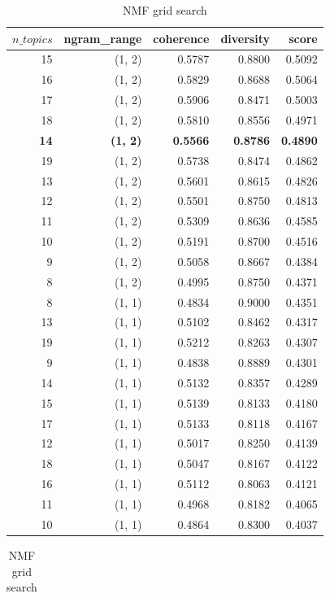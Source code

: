 \documentclass{article}
\begin{document}
\begin{table}[htbp]
\centering
\small
\begin{minipage}{0.42\textwidth}
\begin{tabular}{rrrrr}
\hline
$n\_topics$ & ngram\_range & coherence & diversity & score \\
\hline
15 & (1, 2) & 0.5787 & 0.8800 & 0.5092 \\
16 & (1, 2) & 0.5829 & 0.8688 & 0.5064 \\
17 & (1, 2) & 0.5906 & 0.8471 & 0.5003 \\
18 & (1, 2) & 0.5810 & 0.8556 & 0.4971 \\
\textbf{14} & \textbf{(1, 2)} & \textbf{0.5566} & \textbf{0.8786} & \textbf{0.4890} \\
19 & (1, 2) & 0.5738 & 0.8474 & 0.4862 \\
13 & (1, 2) & 0.5601 & 0.8615 & 0.4826 \\
12 & (1, 2) & 0.5501 & 0.8750 & 0.4813 \\
11 & (1, 2) & 0.5309 & 0.8636 & 0.4585 \\
10 & (1, 2) & 0.5191 & 0.8700 & 0.4516 \\
9  & (1, 2) & 0.5058 & 0.8667 & 0.4384 \\
8  & (1, 2) & 0.4995 & 0.8750 & 0.4371 \\
8  & (1, 1) & 0.4834 & 0.9000 & 0.4351 \\
13 & (1, 1) & 0.5102 & 0.8462 & 0.4317 \\
19 & (1, 1) & 0.5212 & 0.8263 & 0.4307 \\
9  & (1, 1) & 0.4838 & 0.8889 & 0.4301 \\
14 & (1, 1) & 0.5132 & 0.8357 & 0.4289 \\
15 & (1, 1) & 0.5139 & 0.8133 & 0.4180 \\
17 & (1, 1) & 0.5133 & 0.8118 & 0.4167 \\
12 & (1, 1) & 0.5017 & 0.8250 & 0.4139 \\
18 & (1, 1) & 0.5047 & 0.8167 & 0.4122 \\
16 & (1, 1) & 0.5112 & 0.8063 & 0.4121 \\
11 & (1, 1) & 0.4968 & 0.8182 & 0.4065 \\
10 & (1, 1) & 0.4864 & 0.8300 & 0.4037 \\
\hline
\end{tabular}
\caption{NMF grid search}
\label{tab:nmf_grid}
\end{minipage}
\hfill 
\begin{minipage}{0.42\textwidth}
\begin{tabular}{rrrrr}

\end{tabular}
\end{minipage}
\end{table}
\end{document}
